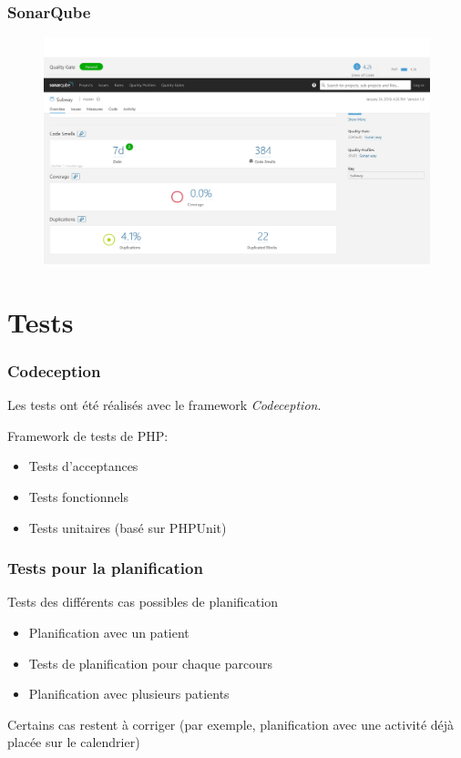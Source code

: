 \documentclass{beamer}
\begin{document}
\begin{frame}
\frametitle{SonarQube}

\begin{figure}
	\includegraphics[scale=0.2]{images/sonar_scanner1}
\end{figure}

\end{frame}

\section{Tests}

\begin{frame}
\frametitle{Codeception}

Les tests ont été réalisés avec le framework \textit{Codeception}.

\bigbreak

Framework de tests de PHP:

\begin{itemize}
	\item Tests d'acceptances
	\item Tests fonctionnels
	\item Tests unitaires (basé sur PHPUnit)
\end{itemize}

\end{frame}

\begin{frame}
\frametitle{Tests pour la planification}

Tests des différents cas possibles de planification

\bigbreak

\begin{itemize}
	\item Planification avec un patient
	\item Tests de planification pour chaque parcours
	\item Planification avec plusieurs patients
\end{itemize}

\bigbreak

Certains cas restent à corriger (par exemple, planification avec une activité déjà placée sur le calendrier)


\end{frame}
\end{document}
